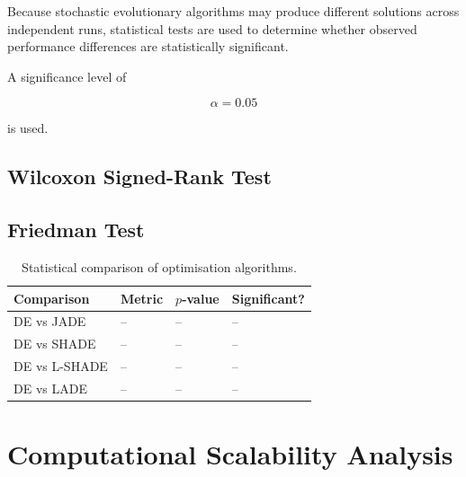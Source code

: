 \documentclass[review]{elsarticle}
\begin{document}
Because stochastic evolutionary algorithms may produce different
solutions across independent runs, statistical tests are used to
determine whether observed performance differences are statistically
significant.

A significance level of

\begin{equation}
\alpha = 0.05
\end{equation}

is used.


\subsection{Wilcoxon Signed-Rank Test}

%
%


\subsection{Friedman Test}

%


\begin{table}[H]
\caption{Statistical comparison of optimisation algorithms.}
\label{tab:stats}
\centering

\begin{tabular}{llll}
\toprule
Comparison & Metric & $p$-value & Significant? \\
\midrule

DE vs JADE      & -- & -- & -- \\
DE vs SHADE     & -- & -- & -- \\
DE vs L-SHADE   & -- & -- & -- \\
DE vs LADE      & -- & -- & -- \\

\bottomrule
\end{tabular}

\end{table}





\section{Computational Scalability Analysis}
\label{sec:scalability}
\end{document}
